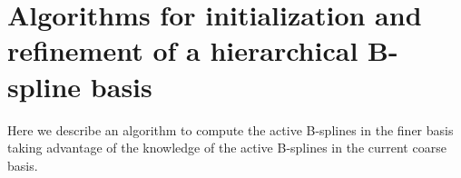\documentclass[a4paper]{siamltex1213}
\newcommand\NN{\mathbb N}
\newcommand\BB{\mathcal B}
\newcommand\HH{\mathcal H}
\begin{document}

\section{Algorithms for initialization and refinement of a hierarchical B-spline basis}


Here we describe an algorithm to compute the active B-splines in the finer basis taking advantage of the knowledge of the active B-splines in the current coarse basis.
\end{document}
